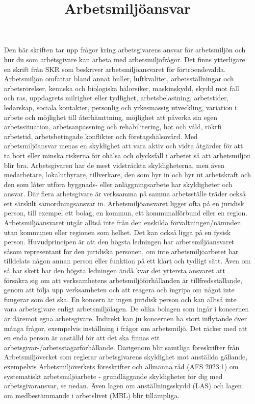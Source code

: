 \title{
Arbetsmiljöansvar
}
Den här skriften tar upp frågor kring arbetsgivarens ansvar för arbetsmiljön och hur du som arbetsgivare kan arbeta med arbetsmiljöfrågor. Det finns ytterligare en skrift från SKR som beskriver arbetsmiljöansvaret för förtroendevalda.
Arbetsmiljön omfattar bland annat buller, luftkvalitet, arbetsställningar och arbetsrörelser, kemiska och biologiska hälorsiker, maskinskydd, skydd mot fall och ras, uppdagrets milrighet eller tydlighet, arbetsbelastning, arbetstider, ledarskap, sociala kontakter, personlig och yrkesmässig utveckling, variation i arbete och möjlighet till återhämttning, möjlighet att påverka sin egen arbetssituation, arbetsanpassning och rehabilitering, hot och våld, rökrfi arbetstid, arbetsbetingade konflikter och företagshälsovård.
Med arbetsmiljöansvar menas en skyldighet att vara aktiv och vidta åtgärder för att ta bort eller minska riskerna för ohälsa och olycksfall i arbetet så att arbetsmiljön blir bra. Arbetsgivaren har de mest vidsträckta skyldigheterna, men även medarbetare, lokaluthyrare, tillverkare, den som hyr in och hyr ut arbetskraft och den som låter utföra byggnads- eller anläggningsarbete har skyldigheter och ansvar. Där flera arbetsgivare är verksamma på samma arbetsställe träder också ett särskilt samordningsansvar in.
Arbetsmiljöansvaret ligger ofta på en juridisk person, till exempel ett bolag, en kommun, ett kommunalförbund eller en region. Arbetsmiljöansvaret utgår alltså inte från den enskilda förvaltningen/nämnden utan kommunen eller regionen som helhet. Det kan också ligga på en fysisk person.
Huvudprincipen är att den högsta ledningen har arbetsmiljöansvaret såsom representant för den juridiska personen, om inte arbetsmiljöarbetet har tilldelats någon annan person eller funktion på ett klart och tydligt sätt. Även om så har skett har den högsta ledningen ändå kvar det yttersta ansvaret att försäkra sig om att verksamhetens arbetsmiljöförhållanden är tillfredsställande, genom att följa upp verksamheten och att reagera och ingripa om något inte fungerar som det ska.
En koncern är ingen juridisk person och kan alltså inte vara arbetsgivare enligt arbetsmiljölagen. De olika bolagen som ingår i koncernen är däremot egna arbetsgivare. Indirekt kan ju koncernen ha stort inflytande över många frågor, exempelvis inställning i frågor om arbetsmiljö.
Det räcker med att en enda person är anställd för att det ska finnas ett arbetsgivar-/arbetsstagarförhållande. Därigenom blir samtliga föreskrifter från Arbetsmiljöverket som reglerar arbetsgivarens skyldighet mot anställda gällande, exempelvis Arbetsmiljöverkets föreskrifter och allmänna råd (AFS 2023:1) om systematiskt arbetsmiljöarbete - grundläggande skyldigheter för dig med arbetsgivaransvar, se nedan. Även lagen om anställningsskydd (LAS) och lagen om medbestämmande i arbetslivet (MBL) blir tillämpliga.

